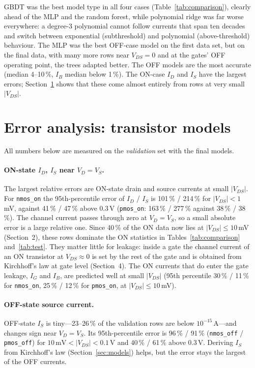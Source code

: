 GBDT was the best model type in all four cases (Table~\ref{tab:comparison}), clearly ahead of
the MLP and the random forest, while polynomial ridge was far worse everywhere: a degree-3
polynomial cannot follow currents that span ten decades and switch between exponential
(subthreshold) and polynomial (above-threshold) behaviour. The MLP was the best OFF-case model
on the first data set, but on the final data, with many more rows near $V_{DS}=0$ and at the
gates' OFF operating point, the trees adapted better. The OFF models are the most accurate
(median 4--10\,\%, $I_B$ median below 1\,\%). The ON-case $I_D$ and $I_S$ have the largest
errors; Section~\ref{sec:error-transistor} shows that these come almost entirely from rows at
very small $|V_{DS}|$.


\section{Error analysis: transistor models}\label{sec:error-transistor}

All numbers below are measured on the \emph{validation} set with the final models.

\paragraph{ON-state $I_D$, $I_S$ near $V_D = V_S$.}
The largest relative errors are ON-state drain and source currents at small $|V_{DS}|$. For
\texttt{nmos\_on} the 95th-percentile error of $I_D$ / $I_S$ is 101\,\% / 214\,\% for
$|V_{DS}|<1$\,mV, against 41\,\% / 47\,\% above 0.3\,V (\texttt{pmos\_on}: 163\,\% /
277\,\% against 38\,\% / 38\,\%). The channel current passes through zero at $V_D=V_S$, so a
small absolute error is a large relative one. Since 40\,\% of the ON data now lies at
$|V_{DS}|\le 10$\,mV (Section~2), these rows dominate the ON statistics in
Tables~\ref{tab:comparison} and~\ref{tab:test}. They matter little for leakage: inside a gate
the channel current of an ON transistor at $V_{DS}\approx0$ is set by the rest of the gate and
is obtained from Kirchhoff's law at gate level (Section~4). The ON currents that do enter the
gate leakage, $I_G$ and $I_B$, are predicted well at small $|V_{DS}|$ (95th percentile
30\,\% / 11\,\% for \texttt{nmos\_on}, 25\,\% / 12\,\% for \texttt{pmos\_on}, at
$|V_{DS}|\le 10$\,mV).

\paragraph{OFF-state source current.}
OFF-state $I_S$ is tiny---23--26\,\% of the validation rows are below $10^{-15}$\,A---and
changes sign near $V_D=V_S$. Its 95th-percentile error is 96\,\% / 91\,\%
(\texttt{nmos\_off} / \texttt{pmos\_off}) for $10\,\text{mV}<|V_{DS}|<0.1$\,V and
40\,\% / 61\,\% above 0.3\,V. Deriving $I_S$ from Kirchhoff's law (Section~\ref{sec:models}) helps, but
the error stays the largest of the OFF currents.

